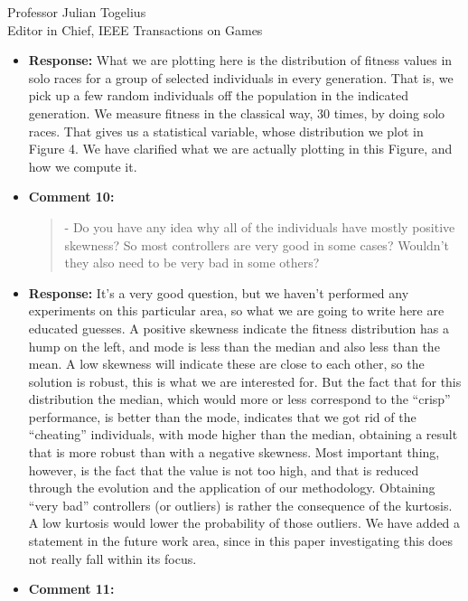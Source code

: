 \documentclass[10pt]{letter} %
\begin{document}
\begin{letter}{Professor Julian Togelius \\ Editor in Chief, IEEE Transactions on Games}
\begin{enumerate}
\begin{itemize}
\begin{quote}
					- I did not understand what fitness value you were actually using in this plots. In my opinion, it would need to be the same value, and the one you are intending to optimise for at the end - so I assume score after a tournament like in table 3. Otherwise the values are incomparable and do not really help you to judge you the robustness of the individuals
				\end{quote}	
			\item {\bf Response:} 
What we are plotting here is the distribution of fitness values in
solo races for a group of selected individuals in every
generation. That is, we pick up a few random individuals off the
population in the indicated generation. We measure fitness in the
classical way, 30 times, by doing solo races. That gives us a
statistical variable, whose distribution we plot in Figure 4. We have
clarified what we are actually plotting in this Figure, and how we
compute it.
			\item {\bf Comment 10:}
				\begin{quote}
					- Do you have any idea why all of the individuals have mostly positive skewness? So most controllers are very good in some cases? Wouldn't they also need to be very bad in some others?
				\end{quote}
			\item {\bf Response:}
It's a very good question, but we haven't performed any experiments on
this particular area, so what we are going to write here are educated
guesses. A positive skewness indicate the fitness distribution has a
hump on the left, and mode is less than the median and also less than
the mean. A low skewness will indicate these are close to each other,
so the solution is robust, this is what we are interested for. But the
fact that for this distribution the median, which would more or less
correspond to the ``crisp'' performance, is better than the mode,
indicates that we got rid of the ``cheating'' individuals, with mode
higher than the median, obtaining a result that is more robust than
with a negative skewness. Most important thing, however, is the fact
that the value is not too high, and that is reduced through the
evolution and the application of our methodology. Obtaining ``very
bad'' controllers (or outliers) is rather the consequence of the
kurtosis. A low kurtosis would lower the probability of those
outliers. We have added a statement in the future work area, since in
this paper investigating this does not really fall within its focus.
			\item {\bf Comment 11:}

\end{itemize}
\end{enumerate}
\end{letter}
\end{document}
